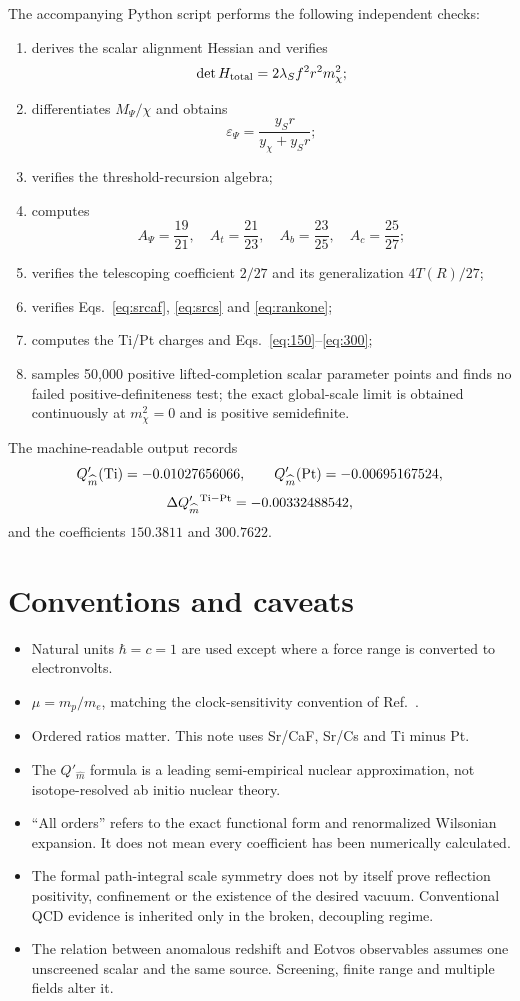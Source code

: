 \documentclass[11pt,a4paper]{article}
\begin{document}
The accompanying Python script performs the following independent checks:

\begin{enumerate}
  \item derives the scalar alignment Hessian and verifies
  \[
  \det H_{\rm total}
  =2\lambda_Sf^2r^2m_\chi^2;
  \]
  \item differentiates $M_\Psi/\chi$ and obtains
  \[
  \varepsilon_\Psi=\frac{y_Sr}{y_\chi+y_Sr};
  \]
  \item verifies the threshold-recursion algebra;
  \item computes
  \[
  A_\Psi=\frac{19}{21},\quad
  A_t=\frac{21}{23},\quad
  A_b=\frac{23}{25},\quad
  A_c=\frac{25}{27};
  \]
  \item verifies the telescoping coefficient $2/27$ and its generalization $4T(R)/27$;
  \item verifies Eqs.~\eqref{eq:srcaf}, \eqref{eq:srcs} and \eqref{eq:rankone};
  \item computes the Ti/Pt charges and Eqs.~\eqref{eq:150}--\eqref{eq:300};
  \item samples 50,000 positive lifted-completion scalar parameter points and finds no failed positive-definiteness test; the exact global-scale limit is obtained continuously at $m_\chi^2=0$ and is positive semidefinite.
\end{enumerate}

The machine-readable output records
\[
Q'_{\widehat m}({\rm Ti})=-0.01027656066,
\qquad
Q'_{\widehat m}({\rm Pt})=-0.00695167524,
\]
\[
\Delta Q'_{\widehat m}{}^{\rm Ti-Pt}
=-0.00332488542,
\]
and the coefficients $150.3811$ and $300.7622$.

\section{Conventions and caveats}

\begin{itemize}
  \item Natural units $\hbar=c=1$ are used except where a force range is converted to electronvolts.
  \item $\mu=m_p/m_e$, matching the clock-sensitivity convention of Ref.~\cite{Elder2025}.
  \item Ordered ratios matter. This note uses Sr/CaF, Sr/Cs and Ti minus Pt.
  \item The $Q'_{\widehat m}$ formula is a leading semi-empirical nuclear approximation, not isotope-resolved ab initio nuclear theory.
  \item ``All orders'' refers to the exact functional form and renormalized Wilsonian expansion. It does not mean every coefficient has been numerically calculated.
  \item The formal path-integral scale symmetry does not by itself prove reflection positivity, confinement or the existence of the desired vacuum. Conventional QCD evidence is inherited only in the broken, decoupling regime.
  \item The relation between anomalous redshift and Eotvos observables assumes one unscreened scalar and the same source. Screening, finite range and multiple fields alter it.
\end{itemize}
\end{document}
